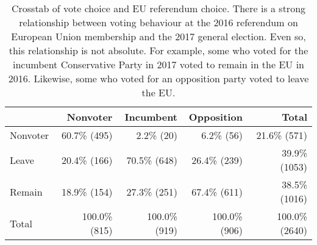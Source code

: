 \begin{table}

\caption{\label{tab:tab1}Crosstab of vote choice and EU referendum choice. There is a strong relationship between voting behaviour at the 2016 referendum on European Union membership and the 2017 general election. Even so, this relationship is not absolute. For example, some who voted for the incumbent Conservative Party in 2017 voted to remain in the EU in 2016. Likewise, some who voted for an opposition party voted to leave the EU.}
\centering
\begin{tabular}[t]{lrrrr}
\toprule
  & \textsf{Nonvoter} & \textsf{Incumbent} & \textsf{Opposition} & \textsf{Total}\\
\midrule
\textsf{Nonvoter} & 60.7\% (495) & 2.2\%  (20) & 6.2\%  (56) & 21.6\%  (571)\\
\textsf{Leave} & 20.4\% (166) & 70.5\% (648) & 26.4\% (239) & 39.9\% (1053)\\
\textsf{Remain} & 18.9\% (154) & 27.3\% (251) & 67.4\% (611) & 38.5\% (1016)\\
\textsf{Total} & 100.0\% (815) & 100.0\% (919) & 100.0\% (906) & 100.0\% (2640)\\
\bottomrule
\end{tabular}
\end{table}